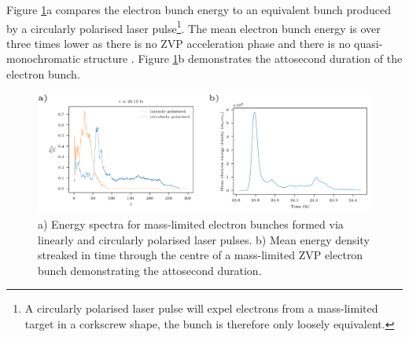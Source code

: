 Figure \ref{fig:zvptypicalbunchlines}a compares the electron bunch energy to an equivalent bunch produced by a circularly polarised laser pulse\footnote{A circularly polarised laser pulse will expel electrons from a mass-limited target in a corkscrew shape, the bunch is therefore only loosely equivalent.}. The mean electron bunch energy is over three times lower as there is no ZVP acceleration phase and there is no quasi-monochromatic structure \cite{baevaZeroVectorPotential2011}. Figure \ref{fig:zvptypicalbunchlines}b demonstrates the attosecond duration of the electron bunch.
\begin{figure}
	\centering
	\includegraphics[width=1\linewidth]{figures/zvp/zvp_typical_bunch_lines}
	\caption[Energy spectra for mass-limited electron bunches formed via linearly and circularly polarised laser pulses.]{a) Energy spectra for mass-limited electron bunches formed via linearly and circularly polarised laser pulses. b) Mean energy density streaked in time through the centre of a mass-limited ZVP electron bunch demonstrating the attosecond duration.}
	\label{fig:zvptypicalbunchlines}
\end{figure}

